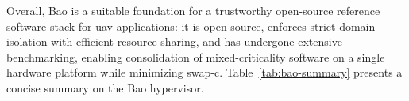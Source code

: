 Overall, Bao is a suitable foundation for a trustworthy open-source reference
software stack for \gls{uav} applications: it is open-source, enforces strict
domain isolation with efficient resource sharing, and has undergone extensive
benchmarking, enabling consolidation of mixed-criticality software on a single
hardware platform while minimizing \gls{swap-c}.
Table~\ref{tab:bao-summary} presents a concise summary on the Bao hypervisor.



